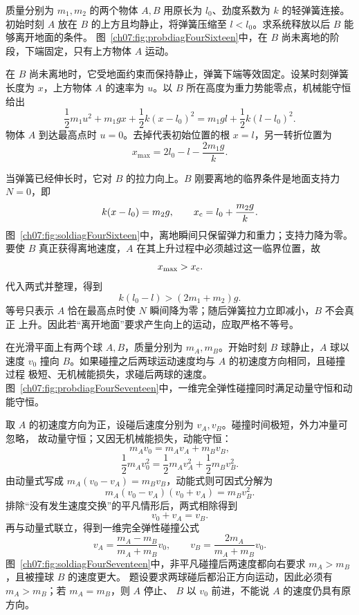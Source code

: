 {
\begin{origexamplebox}{}\label{ch07:ex:s12-4-16}
质量分别为 $m_1,m_2$ 的两个物体 $A,B$ 用原长为 $l_0$、劲度系数为 $k$ 的轻弹簧连接。
初始时刻 $A$ 放在 $B$ 的上方且均静止，将弹簧压缩至 $l<l_0$。求系统释放以后 $B$
能够离开地面的条件。
图~\ref{ch07:fig:probdiagFourSixteen}中，在 $B$ 尚未离地的阶段，下端固定，只有上方物体 $A$ 运动。
\probdiagFourSixteen
\end{origexamplebox}

\begin{xesolution}
在 $B$ 尚未离地时，它受地面约束而保持静止，弹簧下端等效固定。设某时刻弹簧长度为
$x$，上方物体 $A$ 的速率为 $u$。以 $B$ 所在高度为重力势能零点，机械能守恒给出
\[
 \frac12m_1u^2+m_1gx+\frac12k(x-l_0)^2
 =m_1gl+\frac12k(l-l_0)^2.
\]
物体 $A$ 到达最高点时 $u=0$。去掉代表初始位置的根 $x=l$，另一转折位置为
\[
 x_{\max}=2l_0-l-\frac{2m_1g}{k}.
\]

当弹簧已经伸长时，它对 $B$ 的拉力向上。$B$ 刚要离地的临界条件是地面支持力
$N=0$，即
\[
 k(x-l_0)=m_2g,
 \qquad
 x_{\rm c}=l_0+\frac{m_2g}{k}.
\]
图~\ref{ch07:fig:soldiagFourSixteen}中，离地瞬间只保留弹力和重力；支持力降为零。
\soldiagFourSixteen
要使 $B$ 真正获得离地速度，$A$ 在其上升过程中必须越过这一临界位置，故
\[
 x_{\max}>x_{\rm c}.
\]
代入两式并整理，得到
\[
 \boxed{k(l_0-l)>(2m_1+m_2)g}.
\]
等号只表示 $A$ 恰在最高点时使 $N$ 瞬间降为零；随后弹簧拉力立即减小，$B$ 不会真正
上升。因此若“离开地面”要求产生向上的运动，应取严格不等号。
\end{xesolution}

\begin{origexamplebox}{}\label{ch07:ex:s12-4-17}
在光滑平面上有两个球 $A,B$，质量分别为 $m_A,m_B$。开始时刻 $B$ 球静止，$A$ 球以
速度 $v_0$ 撞向 $B$。如果碰撞之后两球运动速度均与 $A$ 的初速度方向相同，且碰撞过程
极短、无机械能损失，求碰后两球的速度。
图~\ref{ch07:fig:probdiagFourSeventeen}中，一维完全弹性碰撞同时满足动量守恒和动能守恒。
\probdiagFourSeventeen
\end{origexamplebox}

\begin{xesolution}
取 $A$ 的初速度方向为正，设碰后速度分别为 $v_A,v_B$。碰撞时间极短，外力冲量可忽略，
故动量守恒；又因无机械能损失，动能守恒：
\[
 m_Av_0=m_Av_A+m_Bv_B,
\]
\[
 \frac12m_Av_0^2
 =\frac12m_Av_A^2+\frac12m_Bv_B^2.
\]
由动量式写成 $m_A(v_0-v_A)=m_Bv_B$，动能式则可因式分解为
\[
 m_A(v_0-v_A)(v_0+v_A)=m_Bv_B^2.
\]
排除“没有发生速度交换”的平凡情形后，两式相除得到
\[
 v_0+v_A=v_B.
\]
再与动量式联立，得到一维完全弹性碰撞公式
\[
 \boxed{v_A=\frac{m_A-m_B}{m_A+m_B}v_0},
 \qquad
 \boxed{v_B=\frac{2m_A}{m_A+m_B}v_0}.
\]
图~\ref{ch07:fig:soldiagFourSeventeen}中，非平凡碰撞后两速度都向右要求 $m_A>m_B$，且被撞球 $B$ 的速度更大。
\soldiagFourSeventeen
题设要求两球碰后都沿正方向运动，因此必须有 $m_A>m_B$；若 $m_A=m_B$，则 $A$ 停止、
$B$ 以 $v_0$ 前进，不能说 $A$ 的速度仍具有原方向。
\end{xesolution}

}
